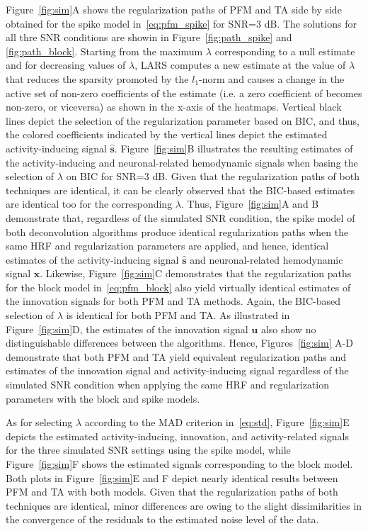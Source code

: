 Figure~\ref{fig:sim}A shows the regularization paths of PFM and TA side by side obtained for the spike model in~\eqref{eq:pfm_spike} for SNR=3 dB. The solutions for all thre SNR conditions are showin in Figure~\ref{fig:path_spike} and \ref{fig:path_block}. Starting from the maximum $\lambda$ corresponding to a null estimate and for decreasing values of $\lambda$, LARS computes a new estimate at the value of $\lambda$ that reduces the sparsity promoted by the \(l_1\)-norm and causes a change in the active set of non-zero coefficients of the estimate (i.e. a zero coefficient of becomes non-zero, or viceversa) as shown in the x-axis of the heatmaps. Vertical black lines depict the selection of the regularization parameter based on BIC, and thus, the colored coefficients indicated by the vertical lines depict the estimated activity-inducing signal $\mathbf{\hat{{s}}}$. Figure~\ref{fig:sim}B illustrates the resulting estimates of the activity-inducing and neuronal-related hemodynamic signals when basing the selection of $\lambda$ on BIC for SNR=3 dB. Given that the regularization paths of both techniques are identical, it can be clearly observed that the BIC-based estimates are identical too for the corresponding $\lambda$. Thus, Figure~\ref{fig:sim}A and B demonstrate that, regardless of the simulated SNR condition, the spike model of both deconvolution algorithms produce identical regularization paths when the same HRF and regularization parameters are applied, and hence, identical estimates of the activity-inducing signal $\mathbf{\hat{{s}}}$ and neuronal-related hemodynamic signal $\mathbf{\hat{{x}}}$. 
Likewise, Figure~\ref{fig:sim}C demonstrates that the regularization paths for the block model in~\eqref{eq:pfm_block} also yield virtually identical estimates of the innovation signals for both PFM and TA methods. Again, the BIC-based selection of $\lambda$ is identical for both PFM and TA. As illustrated in Figure~\ref{fig:sim}D, the estimates of the innovation signal $\mathbf{u}$ also show no distinguishable differences between the algorithms. Hence, Figures~\ref{fig:sim} A-D demonstrate that both PFM and TA yield equivalent regularization paths and estimates of the innovation signal and activity-inducing signal regardless of the simulated SNR condition when applying the same HRF and regularization parameters with the block and spike models.

As for selecting $\lambda$ according to the MAD criterion in~\eqref{eq:std}, Figure~\ref{fig:sim}E depicts the estimated activity-inducing, innovation, and activity-related signals for the three simulated SNR settings using the spike model, while Figure~\ref{fig:sim}F shows the estimated signals corresponding to the block model. Both plots in Figure~\ref{fig:sim}E and F depict nearly identical results between PFM and TA with both models. Given that the regularization paths of both techniques are identical, minor differences are owing to the slight dissimilarities in the convergence of the residuals to the estimated noise level of the data.

